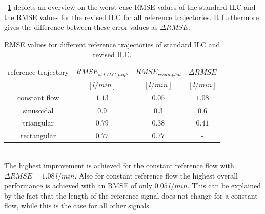 \tablename~\ref{tab:compare_ILC} depicts an overview on the worst case RMSE values of the standard ILC and the RMSE values for the revised ILC for all reference trajectories. It furthermore gives the difference between these error values as $\Delta{RMSE}$.
\begin{table}[h]
  \centering
  \begin{tabular}{c|c|c|c}
    \toprule
     reference trajectory & $RMSE_{std\_ILC,high}$ & $RMSE_{resampled} $ & $\Delta{RMSE} $\\
     & $[l/min]$ & $[l/min]$ & $[l/min]$\\
    \midrule
    constant flow & $1.13$ & $0.05$ & $1.08$ \\
    sinusoidal & $0.9$ & $0.3$ & $0.6$ \\
    triangular & $0.79$ & $0.38$ & $0.41$ \\
    rectangular & $0.77$ & $0.77$ & - \\
    \bottomrule
\end{tabular}
  \caption[RMSE values for different reference trajectories of standard ILC and revised ILC]{RMSE values for different reference trajectories of standard ILC and revised ILC.}
  \label{tab:compare_ILC}
\end{table}
\\The highest improvement is achieved for the constant reference flow with $\Delta{RMSE}=1.08\,l/min$. Also for constant reference flow the highest overall performance is achieved with an RMSE of only $0.05\,l/min$. This can be explained by the fact that the length of the reference signal does not change for a constant flow, while this is the case for all other signals.
